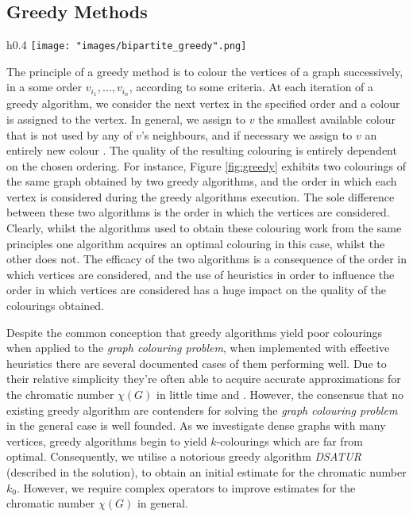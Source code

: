 \documentclass[12pt,a4paper]{article}
\begin{document}
\subsection*{Greedy Methods}
\begin{wrapfigure}{h}{0.4\textwidth}
\texttt{[image: "images/bipartite\_greedy".png]}
\caption{Two colourings of the same graph obtained by greedy algorithms. Created using draw.io.}
\vspace*{-.5cm}
\label{fig:greedy}
\end{wrapfigure}
The principle of a greedy method is to colour the vertices of a graph successively, in a some order $v_{i_1}, \dots , v_{i_n}$, according to some criteria. At each iteration of a greedy algorithm, we consider the next vertex in the specified order and a colour is assigned to the vertex. In general, we assign to $v$ the smallest available colour that is not used by any of $v$'s neighbours, and if necessary we assign to $v$ an entirely new colour \cite{Mitchem}. The quality of the resulting colouring is entirely dependent on the chosen ordering. For instance, Figure \ref{fig:greedy} exhibits two colourings of the same graph obtained by two greedy algorithms, and the order in which each vertex is considered during the greedy algorithms execution. The sole difference between these two algorithms is the order in which the vertices are considered. Clearly, whilst the algorithms used to obtain these colouring work from the same principles one algorithm acquires an optimal colouring in this case, whilst the other does not. The efficacy of the two algorithms is a consequence of the order in which vertices are considered, and the use of heuristics in order to influence the order in which vertices are considered has a huge impact on the quality of the colourings obtained. 
\par Despite the common conception that greedy algorithms yield poor colourings when applied to the \textit{graph colouring problem}, when implemented with effective heuristics there are several documented cases of them performing well. Due to their relative simplicity they're often able to acquire accurate approximations for the chromatic number $\chi(G)$ in little time \cite{Brelaz} and \cite{Leighton}. However, the consensus that no existing  greedy algorithm are contenders for solving the \textit{graph colouring problem} in the general case is well founded. As we investigate dense graphs with many vertices, greedy algorithms begin to yield $k$-colourings which are far from optimal. Consequently, we utilise a notorious greedy algorithm \textit{DSATUR} \cite{Brelaz} (described in the solution), to obtain an initial estimate for the chromatic number $k_0$. However, we require complex operators to improve estimates for the chromatic number $\chi(G)$ in general.
\end{document}
